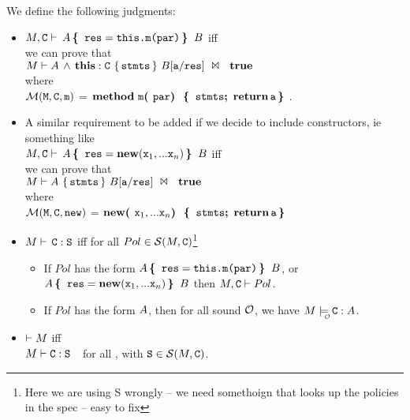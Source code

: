 \begin{definition}
\label{def:M:adheres}
We define the following judgments:

\begin{itemize}
\item
$\M, \prg{C} \vdash\, \A \,\lb \, \prg{res}=\prg{this.m(par)}\, \rb\, \B$ \SP iff    \\
we can prove that\\
 $\HoareExpl      {\A\, \wedge\,  {\kw{this} : \prg{C}}}  {\prg{stmts}} {\M} {\B[\prg{a}/\prg{res}]} {\sd{\kw{true}} }$ %
\\
where\\
  $ \Meths {} {\prg{C}} {\prg{m}}$ =
$\kw{method} \ \prg{m}\lp  \prg{par}  \rp\ \lb\,    \prg{stmts}\semi\, \kw{return}\, \prg{a}\, \rb$.

\item
A similar requirement to be added if we decide to include constructors, ie something like
\\
$\M, \prg{C} \vdash\, \A \,\lb \, \prg{res}=\kw{new}(\prg{x}_1,...\prg{x}_n) \, \rb\, \B$ \SP iff    \\
we can prove that\\
 $\HoareExpl      {\A}  {\prg{stmts}} {\M} {\B[\prg{a}/\prg{res}]} {\sd{\kw{true}} }$ %
\\
where\\
  $ \Meths {} {\prg{C}} {\prg{new}}$ =
$\kw{new} \lp \prg{x}_1,...\prg{x}_n   \rp\ \lb\,    \prg{stmts}\semi\, \kw{return}\, \prg{a}\, \rb$
\item
$\M\vdash\, \prg{C}:\prg{S}$ \SP  iff \SP
for all $Pol\in{\cal S}(\M,\prg{C})$\footnote{Here we are using {\cal S} wrongly -- we need somethoign that looks up the policies in the spec -- easy to fix}
\begin{itemize}
\item If $Pol$ has the form $\A \,\lb \, \prg{res}=\prg{this.m(par)}\, \rb\, \B$,
or  $\A \,\lb \, \prg{res}=\kw{new}(\prg{x}_1,...\prg{x}_n)\, \rb\, \B$ then $\M, \prg{C} \vdash Pol$.
\item If $Pol$ has the form $\A $, then for all sound $\O$,   we have
$\M  \modelsWithO  \prg{C}:\A$.
\end{itemize}

 \item
$  \vdash \M$ \SP  iff \\
   $\M \vdash \prg{C}:\prg{S}\ \ $
  for all ,   with $\prg{S}\in{\cal S}(\M,\prg{C})$.
\end{itemize}

\end{definition}

